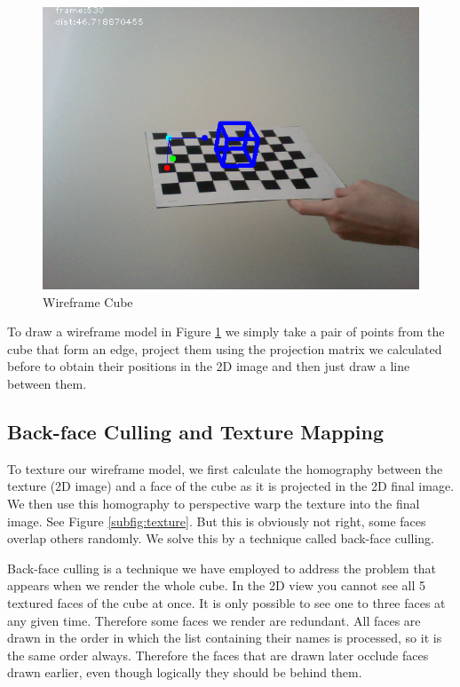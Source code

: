  \begin{figure}[h!]
	\centering
	\includegraphics[width=\textwidth]{final/images/wireframe.png}
	\caption{Wireframe Cube}
	\label{fig:wireframe}
\end{figure}

To draw a wireframe model in Figure \ref{fig:wireframe} we simply take a pair of points from the cube that form an edge, project them using the projection matrix we calculated before to obtain their positions in the 2D image and then just draw a line between them.

\subsection{Back-face Culling and Texture Mapping}

To texture our wireframe model, we first calculate the homography between the texture (2D image) and a face of the cube as it is projected in the 2D final image. We then use this homography to perspective warp the texture into the final image. See Figure \ref{subfig:texture}. But this is obviously not right, some faces overlap others randomly. We solve this by a technique called back-face culling.

Back-face culling is a technique we have employed to address the problem that appears when we render the whole cube. In the 2D view you cannot see all 5 textured faces of the cube at once. It is only possible to see one to three faces at any given time. Therefore some faces we render are redundant. All faces are drawn in the order in which the list containing their names is processed, so it is the same order always. Therefore the faces that are drawn later occlude faces drawn earlier, even though logically they should be behind them. 

